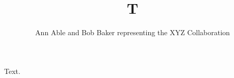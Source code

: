 \documentclass{article}
\begin{document}
\title{T}
\author{Ann Able and Bob Baker representing the XYZ Collaboration}
\maketitle
Text.
\end{document}
